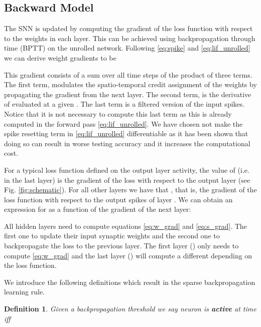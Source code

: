 \documentclass{article}
\newtheorem{definition}{Definition}
\begin{document}
\subsection{Backward Model}

The SNN is updated by computing the gradient of the loss function with respect to the weights in each layer. This can be achieved using backpropagation through time (BPTT) on the unrolled network. Following \eqref{eq:spike} and \eqref{eq:lif_unrolled} we can derive weight gradients to be

\vspace{-0.4cm}


This gradient consists of a sum over all time steps of the product of three terms. The first term, modulates the spatio-temporal credit assignment of the weights by propagating the gradient from the next layer. The second term, is the derivative of  evaluated at a given . The last term is a filtered version of the input spikes. Notice that it is not necessary to compute this last term as this is already computed in the forward pass \eqref{eq:lif_unrolled}. We have chosen not make the spike resetting term in \eqref{eq:lif_unrolled} differentiable as it has been shown that doing so can result in worse testing accuracy \cite{zenke2021remarkable} and it increases the computational cost.

For a typical loss function defined on the output layer activity, the value of  (i.e. in the last layer) is the gradient of the loss with respect to the output layer (see Fig. \ref{fig:schematic}). For all other layers we have that , that is, the gradient of the loss function with respect to the output spikes of layer . We can obtain an expression for  as a function of the gradient of the next layer:



All hidden layers need to compute equations \eqref{eq:w_grad} and \eqref{eq:s_grad}. The first one to update their input synaptic weights and the second one to backpropagate the loss to the previous layer. The first layer () only needs to compute \eqref{eq:w_grad} and the last layer () will compute a different \textcolor{mygreen}{} depending on the loss function. 

We introduce the following definitions which result in the sparse backpropagation learning rule.

\begin{definition}
Given a backpropagation threshold  we say neuron  is \textbf{active} at time  iff


\end{definition}
\end{document}
